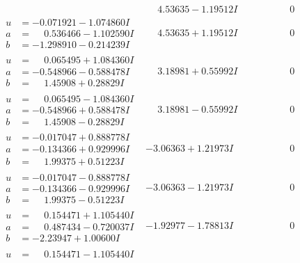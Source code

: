 \documentclass[1p]{elsarticle_modified}
\theoremstyle{definition}
\begin{document}
$$\begin{array}{c|c|c}
 & \phantom{-}4.53635 - 1.19512 I & \phantom{-0.000000 } 0 \\ \hline\begin{aligned}
u &= -0.071921 - 1.074860 I \\
a &= \phantom{-}0.536466 - 1.102590 I \\
b &= -1.298910 - 0.214239 I\end{aligned}
 & \phantom{-}4.53635 + 1.19512 I & \phantom{-0.000000 } 0 \\ \hline\begin{aligned}
u &= \phantom{-}0.065495 + 1.084360 I \\
a &= -0.548966 - 0.588478 I \\
b &= \phantom{-}1.45908 + 0.28829 I\end{aligned}
 & \phantom{-}3.18981 + 0.55992 I & \phantom{-0.000000 } 0 \\ \hline\begin{aligned}
u &= \phantom{-}0.065495 - 1.084360 I \\
a &= -0.548966 + 0.588478 I \\
b &= \phantom{-}1.45908 - 0.28829 I\end{aligned}
 & \phantom{-}3.18981 - 0.55992 I & \phantom{-0.000000 } 0 \\ \hline\begin{aligned}
u &= -0.017047 + 0.888778 I \\
a &= -0.134366 + 0.929996 I \\
b &= \phantom{-}1.99375 + 0.51223 I\end{aligned}
 & -3.06363 + 1.21973 I & \phantom{-0.000000 } 0 \\ \hline\begin{aligned}
u &= -0.017047 - 0.888778 I \\
a &= -0.134366 - 0.929996 I \\
b &= \phantom{-}1.99375 - 0.51223 I\end{aligned}
 & -3.06363 - 1.21973 I & \phantom{-0.000000 } 0 \\ \hline\begin{aligned}
u &= \phantom{-}0.154471 + 1.105440 I \\
a &= \phantom{-}0.487434 - 0.720037 I \\
b &= -2.23947 + 1.00600 I\end{aligned}
 & -1.92977 - 1.78813 I & \phantom{-0.000000 } 0 \\ \hline\begin{aligned}
u &= \phantom{-}0.154471 - 1.105440 I \\

\end{aligned}
\end{array}$$
\end{document}
